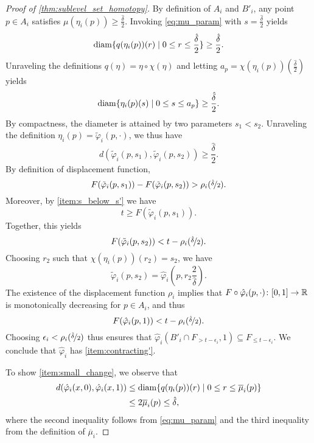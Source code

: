 \begin{proof}[Proof of \cref{thm:sublevel_set_homotopy}]
	By definition of $A_i$ and $B'_{i}$, any point $p \in A_i$ satisfies
	$\mu(\eta_{i}(p)) \geq \frac{\hat{\delta}}{2}$.
	Invoking
	\cref{eq:mu_param} with $s = \frac{\hat{\delta}}{2}$ yields
	\[
	\operatorname{diam}\{q(\eta_{i}(p))(r) \mid 0 \leq r \leq \frac{\hat{\delta}}{2}\} \geq \frac{\hat{\delta}}{2}.
	\]
	Unraveling the definitions $q(\eta) = \eta \circ \chi(\eta)$
	and letting $a_p = \chi(\eta_{i}(p))(\frac{\hat{\delta}}{2})$
	yields
	\[
	\operatorname{diam}\{\eta_{i}(p)(s) \mid 0 \leq s \leq a_p\} \geq \frac{\hat{\delta}}{2}.
	\]
%
%
	By compactness, the diameter is attained by two parameters $s_1<s_2$.
	Unraveling the definition $\eta_{i}(p)=\tilde{\varphi}_{i}(p,\cdot)$,
	we thus have
	\[
	d(\tilde{\varphi}_{i}(p,s_1), \tilde{\varphi}_{i}(p,s_2)) \geq \frac{\hat{\delta}}{2}.\]
	By definition of displacement function,
	\[F(\tilde{\varphi}_{i}(p,s_1)) - F(\tilde{\varphi}_{i}(p,s_2)) > \rho_{i}(\nicefrac{\hat{\delta}}{2}).\]
	Moreover, by \cref{item:s_below_s'} we have
	\[
	t \geq F(\tilde{\varphi}_{i}(p,s_1)).
	\]
	Together, this yields
	\[F(\tilde{\varphi}_{i}(p,s_2)) < t - \rho_{i}(\nicefrac{\hat{\delta}}{2}).\]
	Choosing $r_2$ such that $\chi(\eta_{i}(p))(r_2)= s_2$,
	we have
	\[\tilde{\varphi}_{i}(p,s_2) =
	\hat{\varphi}_{i}(p,r_2\frac{2}{\hat{\delta}}).
	\]
	The existence of the displacement function $\rho_i$ implies that $F \circ \hat{\varphi}_i(p,\cdot) \colon [0,1] \to \mathbb{R}$ is monotonically decreasing for $p \in A_i$, and thus
	\[F(\hat{\varphi}_{i}(p,1)) < t - \rho_{i}(\nicefrac{\hat{\delta}}{2}).\]
	Choosing $\epsilon_i < \rho_{i}(\nicefrac{\hat{\delta}}{2})$ thus ensures that $\hat{\varphi}_{i}(B'_{i} \cap F_{> t-\epsilon_{i}},1) \subseteq F_{\leq t-\epsilon_{i}}$.
	We conclude that $\hat{\varphi}_{i}$ has \cref{item:contracting'}.



	To show \cref{item:small_change}, we observe that
	\begin{align*}
	d(\hat{\varphi}_{i}(x, 0), \hat{\varphi}_{i}(x,1)) &\leq
	\diam\{q(\eta_{i}(p))(r) \mid 0 \leq r \leq \overline{\mu}_{i}(p)\} \\
	&
	\leq 2 \overline{\mu}_{i}(p)%
	\leq\hat{\delta},
	\end{align*}
	where the second inequality follows from \cref{eq:mu_param} and the third inequality from the definition of $\overline{\mu}_{i}$.


\end{proof}
